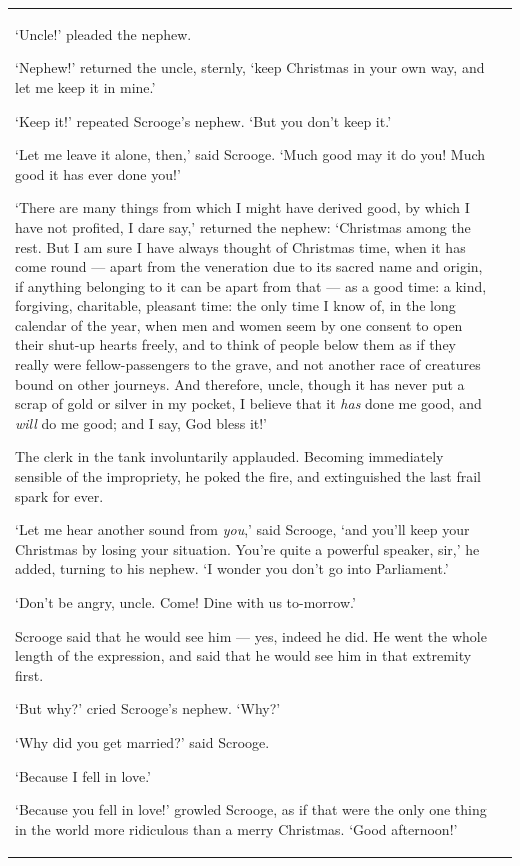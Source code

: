 \documentclass[11pt,twoside]{article}\makeatletter
\begin{document}
\begin{longtable}{P{0.19558457711442787\textwidth}P{0.6544154228855721\textwidth}}
‘Uncle!’ pleaded the nephew.\par
‘Nephew!’ returned the uncle, sternly, ‘keep Christmas in your own way, and let me keep it in mine.’\par
‘Keep it!’ repeated Scrooge's nephew. ‘But you don't keep it.’\par
‘Let me leave it alone, then,’ said Scrooge. ‘Much good may it do you! Much good it has ever done you!’\par
‘There are many things from which I might have derived good, by which I have not profited, I dare say,’ returned the nephew: ‘Christmas among the rest. But I am sure I have always thought of Christmas time, when it has come round — apart from the veneration due to its sacred name and origin, if anything belonging to it can be apart from that — as a good time: a kind, forgiving, charitable, pleasant time: the only time I know of, in the long calendar of the year, when men and women seem by one consent to open their shut-up hearts freely, and to think of people below them as if they really were fellow-passengers to the grave, and not another race of creatures bound on other journeys. And therefore, uncle, though it has never put a scrap of gold or silver in my pocket, I believe that it \textit{has} done me good, and \textit{will} do me good; and I say, God bless it!’\par
The clerk in the tank involuntarily applauded. Becoming immediately sensible of the impropriety, he poked the fire, and extinguished the last frail spark for ever. \par
‘Let me hear another sound from \textit{you},’ said Scrooge, ‘and you'll keep your Christmas by losing your situation. You're quite a powerful speaker, sir,’ he added, turning to his nephew. ‘I wonder you don't go into Parliament.’\par
‘Don't be angry, uncle. Come! Dine with us to-morrow.’\par
Scrooge said that he would see him — yes, indeed he did. He went the whole length of the expression, and said that he would see him in that extremity first. \par
‘But why?’ cried Scrooge's nephew. ‘Why?’\par
‘Why did you get married?’ said Scrooge.\par
‘Because I fell in love.’\par
‘Because you fell in love!’ growled Scrooge, as if that were the only one thing in the world more ridiculous than a merry Christmas. ‘Good afternoon!’\par

\end{longtable}
\end{document}

